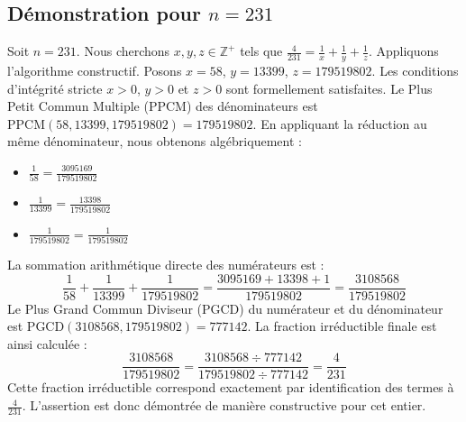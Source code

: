 \documentclass[11pt,a4paper]{article}
\begin{document}
\subsection{Démonstration pour $n = 231$}
Soit $n = 231$. Nous cherchons $x, y, z \in \mathbb{Z}^{+}$ tels que $\frac{4}{231} = \frac{1}{x} + \frac{1}{y} + \frac{1}{z}$.
Appliquons l'algorithme constructif. Posons $x = 58$, $y = 13399$, $z = 179519802$.
Les conditions d'intégrité stricte $x > 0$, $y > 0$ et $z > 0$ sont formellement satisfaites.
Le Plus Petit Commun Multiple (PPCM) des dénominateurs est $\text{PPCM}(58, 13399, 179519802) = 179519802$.
En appliquant la réduction au même dénominateur, nous obtenons algébriquement :
\begin{itemize}
    \item $\frac{1}{58} = \frac{3095169}{179519802}$
    \item $\frac{1}{13399} = \frac{13398}{179519802}$
    \item $\frac{1}{179519802} = \frac{1}{179519802}$
\end{itemize}
La sommation arithmétique directe des numérateurs est :
$$ \frac{1}{58} + \frac{1}{13399} + \frac{1}{179519802} = \frac{3095169 + 13398 + 1}{179519802} = \frac{3108568}{179519802} $$
Le Plus Grand Commun Diviseur (PGCD) du numérateur et du dénominateur est $\text{PGCD}(3108568, 179519802) = 777142$.
La fraction irréductible finale est ainsi calculée :
$$ \frac{3108568}{179519802} = \frac{3108568 \div 777142}{179519802 \div 777142} = \frac{4}{231} $$
Cette fraction irréductible correspond exactement par identification des termes à $\frac{4}{231}$. L'assertion est donc démontrée de manière constructive pour cet entier.
\end{document}
